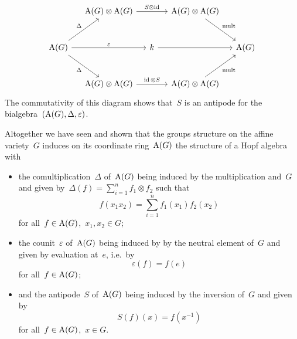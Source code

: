 \begin{fluff}
\begin{itemize}[resume]
            \[
        \begin{tikzcd}[column sep = small, row sep = large]
            {}
          & \coord(G) \tensor \coord(G)
            \arrow{rr}[above]{S \mathbin{\otimes} \id}
          & {}
          & \coord(G) \tensor \coord(G)
            \arrow{dr}[above right]{\text{mult}}
          & {}
          \\
            \coord(G)
            \arrow{ur}[above left]{\Delta}
            \arrow{rr}[above]{\varepsilon}
            \arrow{dr}[below left]{\Delta}
          & {}
          & k
            \arrow{rr}
          & {}
          & \coord(G)
          \\
            {}
          & \coord(G) \tensor \coord(G)
            \arrow{rr}[above]{\id \tensor S}
          & {}
          & \coord(G) \tensor \coord(G)
            \arrow{ur}[below right]{\text{mult}}
          & {}
        \end{tikzcd}
      \]
      The commutativity of this diagram shows that~$S$ is an antipode for the bialgebra~$(\operatorname{A}(G), \Delta, \varepsilon)$.
  \end{itemize}

  Altogether we have seen and shown that the groups structure on the affine variety~$G$ induces on its coordinate ring~$\operatorname{A}(G)$ the structure of a Hopf algebra with
  \begin{itemize}
    \item
      the comultiplication~$\Delta$ of~$\operatorname{A}(G)$ being induced by the multiplication and~$G$ and given by~$\Delta(f) = \sum_{i=1}^n f_1 \otimes f_2$ such that
      \begin{equation}
      \label{explicit description of comultiplication}
          f(x_1 x_2)
        = \sum_{i=1}^n f_1(x_1) f_2(x_2)
      \end{equation}
      for all~$f \in \operatorname{A}(G)$,~$x_1, x_2 \in G$;
    \item
      the counit~$\varepsilon$ of~$\operatorname{A}(G)$ being induced by by the neutral element of~$G$ and given by evaluation at~$e$, i.e.\ by
      \begin{equation}
      \label{explicit description of counit}
          \varepsilon(f)
        = f(e)
      \end{equation}
      for all~$f \in \operatorname{A}(G)$;
    \item
      and the antipode~$S$ of~$\operatorname{A}(G)$ being induced by the inversion of~$G$ and given by
      \begin{equation}
      \label{explicit description of antipode}
          S(f)(x)
        = f(x^{-1})
      \end{equation}
      for all~$f \in \operatorname{A}(G)$,~$x \in G$.
  \end{itemize}
\end{fluff}


